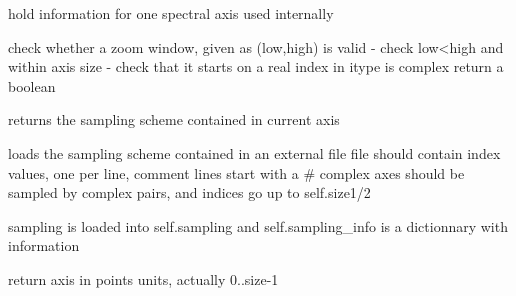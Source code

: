 \documentclass[letterpaper,10pt,openany,oneside]{sphinxmanual}
\begin{document}
\begin{fulllineitems}
\label{rst/code:NPKData.Axis}
hold information for one spectral axis
used internally

\begin{fulllineitems}
\label{rst/code:NPKData.Axis.check_zoom}
check whether a zoom window, given as (low,high) is valid
- check low\textless{}high and within axis size
- check that it starts on a real index in itype is complex
return a boolean

\end{fulllineitems}


\begin{fulllineitems}
\label{rst/code:NPKData.Axis.get_sampling}
returns the sampling scheme contained in current axis

\end{fulllineitems}


\begin{fulllineitems}
\label{rst/code:NPKData.Axis.load_sampling}
loads the sampling scheme contained in an external file
file should contain index values, one per line, comment lines start with a \#
complex axes should be sampled by complex pairs, and indices go up to self.size1/2

sampling is loaded into self.sampling  and self.sampling\_info is a dictionnary with information

\end{fulllineitems}


\begin{fulllineitems}
\label{rst/code:NPKData.Axis.points_axis}
return axis in points units, actually 0..size-1

\end{fulllineitems}



\end{fulllineitems}
\end{document}
